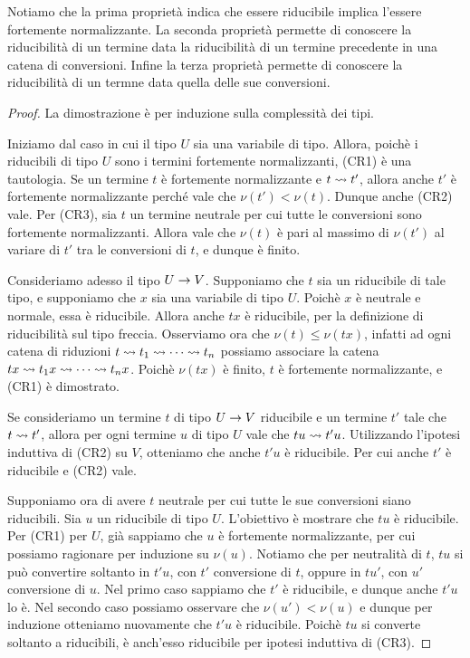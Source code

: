 \documentclass[]{marticle}
\begin{document}
Notiamo che la prima propriet\`a indica che essere riducibile implica l'essere
fortemente normalizzante. La seconda propriet\`a permette di conoscere la
riducibilit\`a di un termine data la riducibilit\`a di un termine precedente in
una catena di conversioni. Infine la terza propriet\`a permette di conoscere la
riducibilit\`a di un termne data quella delle sue conversioni.

\begin{proof}
    La dimostrazione \`e per induzione sulla complessit\`a dei tipi.

    Iniziamo dal caso in cui il tipo $U$ sia una variabile di tipo. Allora,
    poich\`e i riducibili di tipo $U$ sono i termini fortemente normalizzanti,
    (CR1) \`e una tautologia. Se un termine $t$ \`e fortemente normalizzante e
    $t\rightsquigarrow t'$, allora anche $t'$ \`e fortemente normalizzante perch\'e vale
    che $\nu(t')<\nu(t)$. Dunque anche (CR2) vale. Per (CR3), sia $t$ un termine
    neutrale per cui tutte le conversioni sono fortemente normalizzanti. Allora
    vale che $\nu(t)$ \`e pari al massimo di $\nu(t')$ al variare di $t'$ tra le
    conversioni di $t$, e dunque \`e finito.

    Consideriamo adesso il tipo $U\rightarrow V$.  Supponiamo che $t$ sia un riducibile
    di tale tipo, e supponiamo che $x$ sia una variabile di tipo $U$. Poich\`e
    $x$ \`e neutrale e normale, essa \`e riducibile. Allora anche $tx$ \`e
    riducibile, per la definizione di riducibilit\`a sul tipo freccia.
    Osserviamo ora che $\nu(t)\leq \nu(tx)$, infatti ad ogni catena di
    riduzioni $t\rightsquigarrow t_1 \rightsquigarrow\cdots \rightsquigarrow t_n$ possiamo associare la
    catena $tx \rightsquigarrow t_1 x \rightsquigarrow\cdots \rightsquigarrow t_n x$. Poich\`e $\nu(tx)$ \`e
    finito, $t$ \`e fortemente normalizzante, e (CR1) \`e dimostrato.

    Se consideriamo un termine $t$ di tipo $U\rightarrow V$ riducibile e un termine
    $t'$ tale che $t\rightsquigarrow t'$, allora per ogni termine $u$ di tipo $U$ vale che
    $tu\rightsquigarrow t'u$. Utilizzando l'ipotesi induttiva di (CR2) su $V$, otteniamo
    che anche $t'u$ \`e riducibile. Per cui anche $t'$ \`e riducibile e (CR2)
    vale.

    Supponiamo ora di avere $t$ neutrale per cui tutte le sue conversioni siano
    riducibili. Sia $u$ un riducibile di tipo $U$. L'obiettivo \`e mostrare che
    $tu$ \`e riducibile. Per (CR1) per $U$, gi\`a sappiamo che $u$ \`e
    fortemente normalizzante, per cui possiamo ragionare per induzione su
    $\nu(u)$. Notiamo che per neutralit\`a di $t$, $tu$ si pu\`o convertire
    soltanto in $t'u$, con $t'$ conversione di $t$, oppure in $tu'$, con $u'$
    conversione di $u$. Nel primo caso sappiamo che $t'$ \`e riducibile, e
    dunque anche $t'u$ lo \`e. Nel secondo caso possiamo osservare che $\nu(u')
    < \nu(u)$ e dunque per induzione otteniamo nuovamente che $t'u$ \`e
    riducibile. Poich\`e $tu$ si converte soltanto a riducibili, \`e anch'esso
    riducibile per ipotesi induttiva di (CR3). 
\end{proof}
\end{document}
